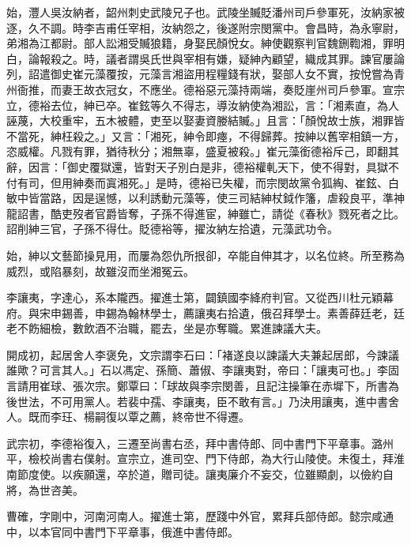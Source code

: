 \begin{pinyinscope}
 始，灃人吳汝納者，韶州刺史武陵兄子也。武陵坐贓貶潘州司戶參軍死，汝納家被逐，久不調。時李吉甫任宰相，汝納怨之，後遂附宗閔黨中。會昌時，為永寧尉，弟湘為江都尉。部人訟湘受贓狼籍，身娶民顏悅女。紳使觀察判官魏鉶鞫湘，罪明白，論報殺之。時，議者謂吳氏世與宰相有嫌，疑紳內顧望，織成其罪。諫官屢論列，詔遣御史崔元藻覆按，元藻言湘盜用程糧錢有狀，娶部人女不實，按悅嘗為青州衙推，而妻王故衣冠女，不應坐。德裕惡元藻持兩端，奏貶崖州司戶參軍。宣宗立，德裕去位，紳已卒。崔鉉等久不得志，導汝納使為湘訟，言：「湘素直，為人誣蔑，大校重牢，五木被體，吏至以娶妻資媵結贓。」且言：「顏悅故士族，湘罪皆不當死，紳枉殺之。」又言：「湘死，紳令即瘞，不得歸葬。按紳以舊宰相鎮一方，恣威權。凡戮有罪，猶待秋分；湘無辜，盛夏被殺。」崔元藻銜德裕斥己，即翻其辭，因言：「御史覆獄還，皆對天子別白是非，德裕權軋天下，使不得對，具獄不付有司，但用紳奏而寘湘死。」是時，德裕已失權，而宗閔故黨令狐綯、崔鉉、白敏中皆當路，因是逞憾，以利誘動元藻等，使三司結紳杖鉞作籓，虐殺良平，準神龍詔書，酷吏歿者官爵皆奪，子孫不得進宦，紳雖亡，請從《春秋》戮死者之比。詔削紳三官，子孫不得仕。貶德裕等，擢汝納左拾遺，元藻武功令。



 始，紳以文藝節操見用，而屢為怨仇所拫卻，卒能自伸其才，以名位終。所至務為威烈，或陷暴刻，故雖沒而坐湘冤云。



 李讓夷，字達心，系本隴西。擢進士第，闢鎮國李絳府判官。又從西川杜元穎幕府。與宋申錫善，申錫為翰林學士，薦讓夷右拾遺，俄召拜學士。素善薛廷老，廷老不飭細檢，數飲酒不治職，罷去，坐是亦奪職。累進諫議大夫。



 開成初，起居舍人李褒免，文宗謂李石曰：「褚遂良以諫議大夫兼起居郎，今諫議誰歟？可言其人。」石以馮定、孫簡、蕭俶、李讓夷對，帝曰：「讓夷可也。」李固言請用崔球、張次宗。鄭覃曰：「球故與李宗閔善，且記注操筆在赤墀下，所書為後世法，不可用黨人。若裴中孺、李讓夷，臣不敢有言。」乃決用讓夷，進中書舍人。既而李玨、楊嗣復以覃之薦，終帝世不得遷。



 武宗初，李德裕復入，三遷至尚書右丞，拜中書侍郎、同中書門下平章事。潞州平，檢校尚書右僕射。宣宗立，進司空、門下侍郎，為大行山陵使。未復土，拜淮南節度使。以疾願還，卒於道，贈司徒。讓夷廉介不妄交，位雖顯劇，以儉約自將，為世咨美。



 曹確，字剛中，河南河南人。擢進士第，歷踐中外官，累拜兵部侍郎。懿宗咸通中，以本官同中書門下平章事，俄進中書侍郎。




\end{pinyinscope}
